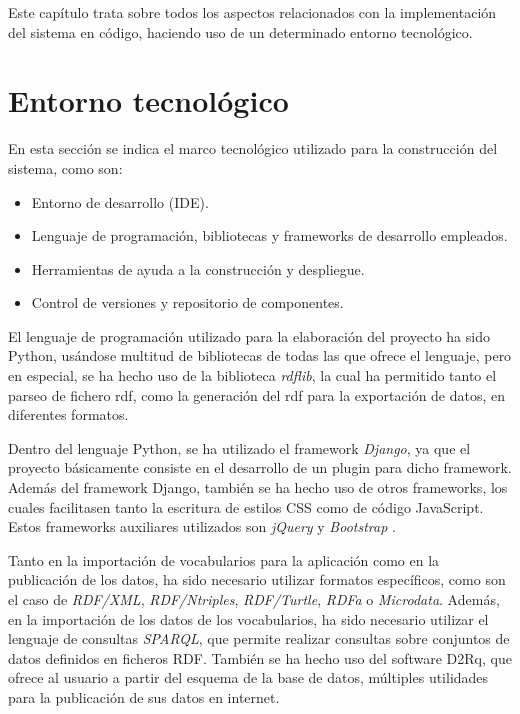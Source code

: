 

Este capítulo trata sobre todos los aspectos relacionados con la implementación
del sistema en código, haciendo uso de un determinado entorno tecnológico.

\section{Entorno tecnológico}
En esta sección se indica el marco tecnológico utilizado para la construcción
del sistema, como son:
\begin{itemize}
    \item Entorno de desarrollo (IDE).
    \item Lenguaje de programación, bibliotecas y frameworks de desarrollo
          empleados.
    \item Herramientas de ayuda a la construcción y despliegue.
    \item Control de versiones y repositorio de componentes.
\end{itemize}

El lenguaje de programación utilizado para la elaboración del proyecto ha sido
Python, usándose multitud de bibliotecas de todas las que ofrece el lenguaje,
pero en especial, se ha hecho uso de la biblioteca \textit{rdflib}, la cual ha
permitido tanto el parseo de fichero rdf, como la generación del rdf para la
exportación de datos, en diferentes formatos.

Dentro del lenguaje Python, se ha utilizado el framework \textit{Django}, ya que
el proyecto básicamente consiste en el desarrollo de un plugin para dicho
framework. Además del framework Django, también se ha hecho uso de otros
frameworks, los cuales facilitasen tanto la escritura de estilos CSS como de
código JavaScript. Estos frameworks auxiliares utilizados son \textit{jQuery}
\cite{jQuery} y \textit{Bootstrap} \cite{Bootstrap}.

Tanto en la importación de vocabularios para la aplicación como en la
publicación de los datos, ha sido necesario utilizar formatos específicos, como
son el caso de \textit{RDF/XML}, \textit{RDF/Ntriples}, \textit{RDF/Turtle},
\textit{RDFa} o \textit{Microdata}. Además, en la importación de los datos de
los vocabularios, ha sido necesario utilizar el lenguaje de consultas
\textit{SPARQL}, que permite realizar consultas sobre conjuntos de datos
definidos en ficheros RDF. También se ha hecho uso del software D2Rq, que ofrece
al usuario a partir del esquema de la base de datos, múltiples utilidades para
la publicación de sus datos en internet.

